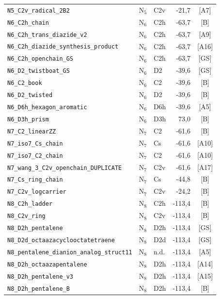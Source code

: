 \begin{longtable}{@{}p{4.6cm}lp{1.4cm}rc@{}}
\texttt{N5\_C2v\_radical\_2B2} & N$_{5}$ & C2v & -21{,}7 & [A7] \\
\addlinespace
\texttt{N6\_C2h\_chain} & N$_{6}$ & C2h & -63{,}7 & [B] \\
\texttt{N6\_C2h\_trans\_diazide\_v2} & N$_{6}$ & C2h & -63{,}7 & [A9] \\
\texttt{N6\_C2h\_diazide\_synthesis\_product} & N$_{6}$ & C2h & -63{,}7 & [A16] \\
\texttt{N6\_C2h\_openchain\_GS} & N$_{6}$ & C2h & -63{,}7 & [GS] \\
\texttt{N6\_D2\_twistboat\_GS} & N$_{6}$ & D2 & -39{,}6 & [GS] \\
\texttt{N6\_C2\_book} & N$_{6}$ & C2 & -39{,}6 & [B] \\
\texttt{N6\_D2\_twisted} & N$_{6}$ & D2 & -39{,}6 & [B] \\
\texttt{N6\_D6h\_hexagon\_aromatic} & N$_{6}$ & D6h & -39{,}6 & [A5] \\
\texttt{N6\_D3h\_prism} & N$_{6}$ & D3h & 73{,}0 & [B] \\
\addlinespace
\texttt{N7\_C2\_linearZZ} & N$_{7}$ & C2 & -61{,}6 & [B] \\
\texttt{N7\_iso7\_Cs\_chain} & N$_{7}$ & Cs & -61{,}6 & [A10] \\
\texttt{N7\_iso7\_C2\_chain} & N$_{7}$ & C2 & -61{,}6 & [A10] \\
\texttt{N7\_wang\_3\_C2v\_openchain\_DUPLICATE} & N$_{7}$ & C2v & -61{,}6 & [A17] \\
\texttt{N7\_Cs\_ring\_chain} & N$_{7}$ & Cs & -44{,}8 & [B] \\
\texttt{N7\_C2v\_logcarrier} & N$_{7}$ & C2v & -24{,}2 & [B] \\
\addlinespace
\texttt{N8\_C2h\_ladder} & N$_{8}$ & C2h & -113{,}4 & [B] \\
\texttt{N8\_C2v\_ring} & N$_{8}$ & C2v & -113{,}4 & [B] \\
\texttt{N8\_D2h\_pentalene} & N$_{8}$ & D2h & -113{,}4 & [GS] \\
\texttt{N8\_D2d\_octaazacyclooctatetraene} & N$_{8}$ & D2d & -113{,}4 & [GS] \\
\texttt{N8\_pentalene\_dianion\_analog\_struct11} & N$_{8}$ & n.d. & -113{,}4 & [A5] \\
\texttt{N8\_D2h\_octaazapentalene} & N$_{8}$ & D2h & -113{,}4 & [A14] \\
\texttt{N8\_D2h\_pentalene\_v3} & N$_{8}$ & D2h & -113{,}4 & [A15] \\
\texttt{N8\_D2h\_pentalene\_B} & N$_{8}$ & D2h & -113{,}4 & [B] \\

\end{longtable}
